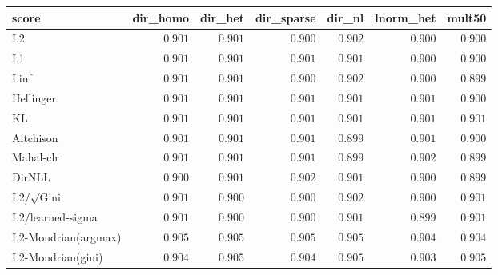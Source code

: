 \begin{tabular}{lrrrrrr}
\toprule
score & dir\_homo & dir\_het & dir\_sparse & dir\_nl & lnorm\_het & mult50 \\
\midrule
L2 & $0.901$ & $0.901$ & $0.900$ & $0.902$ & $0.900$ & $0.900$ \\
L1 & $0.901$ & $0.901$ & $0.901$ & $0.901$ & $0.900$ & $0.900$ \\
Linf & $0.901$ & $0.901$ & $0.900$ & $0.902$ & $0.900$ & $0.899$ \\
Hellinger & $0.901$ & $0.901$ & $0.901$ & $0.901$ & $0.901$ & $0.900$ \\
KL & $0.901$ & $0.901$ & $0.901$ & $0.901$ & $0.901$ & $0.901$ \\
Aitchison & $0.901$ & $0.901$ & $0.901$ & $0.899$ & $0.901$ & $0.900$ \\
Mahal-clr & $0.901$ & $0.901$ & $0.901$ & $0.899$ & $0.902$ & $0.899$ \\
DirNLL & $0.900$ & $0.901$ & $0.902$ & $0.901$ & $0.900$ & $0.899$ \\
L2/$\sqrt{\mathrm{Gini}}$ & $0.901$ & $0.900$ & $0.900$ & $0.902$ & $0.900$ & $0.901$ \\
L2/learned-sigma & $0.901$ & $0.900$ & $0.900$ & $0.901$ & $0.899$ & $0.901$ \\
L2-Mondrian(argmax) & $0.905$ & $0.905$ & $0.905$ & $0.905$ & $0.904$ & $0.904$ \\
L2-Mondrian(gini) & $0.904$ & $0.905$ & $0.904$ & $0.905$ & $0.903$ & $0.905$ \\
\bottomrule
\end{tabular}